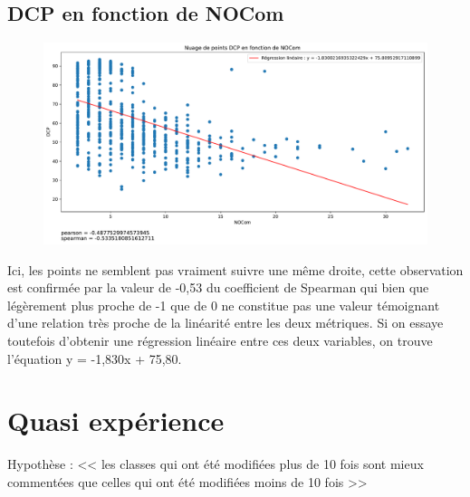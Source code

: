 \documentclass[11pt]{rapport-tp-qlm}
\begin{document}
    \section{DCP en fonction de NOCom}
 
    \begin{figure}[h]
    \includegraphics[scale=0.5]{assets/relation_DCP_NOCom}
    \centering
    \end{figure}

Ici, les points ne semblent pas vraiment suivre une même droite, cette observation est confirmée par la valeur de -0,53 du coefficient de Spearman qui bien que légèrement plus proche de -1 que de 0 ne constitue pas une valeur témoignant d'une relation très proche de la linéarité entre les deux métriques. Si on essaye toutefois d'obtenir une régression linéaire entre ces deux variables, on trouve l'équation y = -1,830x + 75,80.
    
\chapter{Quasi expérience}
Hypothèse : << les classes qui ont été modifiées plus de 10 fois sont mieux commentées que celles qui ont été modifiées moins de 10 fois >>
\end{document}
